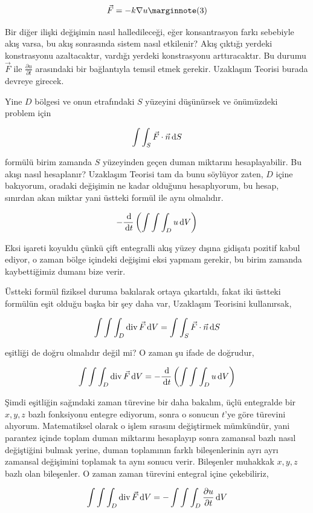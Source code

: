 \documentclass[12pt,fleqn]{article}\usepackage{../../common}
\begin{document}
$$
\vec{F} = -k \nabla u
\mlabel{3}
$$

Bir diğer ilişki değişimin nasıl halledileceği, eğer konsantrasyon farkı
sebebiyle akış varsa, bu akış sonrasında sistem nasıl etkilenir? Akış çıktığı
yerdeki konstrasyonu azaltacaktır, vardığı yerdeki konstrasyonu arttıracaktır.
Bu durumu $\vec{F}$ ile $\frac{\partial u}{\partial t}$ arasındaki bir
bağlantıyla temsil etmek gerekir. Uzaklaşım Teorisi burada devreye girecek.

Yine $D$ bölgesi ve onun etrafındaki $S$ yüzeyini düşünürsek ve önümüzdeki
problem için

$$
\int \int_S \vec{F} \cdot \vec{n} \,\mathrm{d} S
$$

formülü birim zamanda $S$ yüzeyinden geçen duman miktarını hesaplayabilir.  Bu
akışı nasıl hesaplanır? Uzaklaşım Teorisi tam da bunu söylüyor zaten, $D$ içine
bakıyorum, oradaki değişimin ne kadar olduğunu hesaplıyorum, bu hesap, sınırdan
akan miktar yani üstteki formül ile aynı olmalıdır.

$$
- \frac{\,\mathrm{d} }{\,\mathrm{d} t} \left(
\int \int \int_D u \,\mathrm{d} V
\right)
$$

Eksi işareti koyuldu çünkü çift entegralli akış yüzey dışına gidişatı pozitif
kabul ediyor, o zaman bölge içindeki değişimi eksi yapmam gerekir, bu birim
zamanda kaybettiğimiz dumanı bize verir.

Üstteki formül fiziksel duruma bakılarak ortaya çıkartıldı, fakat iki üstteki
formülün eşit olduğu başka bir şey daha var, Uzaklaşım Teorisini kullanırsak,

$$
\int \int \int_D \operatorname{div} \vec{F} \,\mathrm{d} V =
\int \int_S \vec{F} \cdot \vec{n} \,\mathrm{d} S
$$

eşitliği de doğru olmalıdır değil mi? O zaman şu ifade de doğrudur,

$$
\int \int \int_D \operatorname{div} \vec{F} \,\mathrm{d} V =
- \frac{\,\mathrm{d} }{\,\mathrm{d} t} \left( \int \int \int_D u \,\mathrm{d} V \right)
$$

Şimdi eşitliğin sağındaki zaman türevine bir daha bakalım, üçlü entegralde bir
$x,y,z$ bazlı fonksiyonu entegre ediyorum, sonra o sonucun $t$'ye göre türevini
alıyorum. Matematiksel olarak o işlem sırasını değiştirmek mümkündür, yani
parantez içinde toplam duman miktarını hesaplayıp sonra zamansal bazlı nasıl
değiştiğini bulmak yerine, duman toplamının farklı bileşenlerinin ayrı ayrı
zamansal değişimini toplamak ta aynı sonucu verir. Bileşenler muhakkak $x,y,z$
bazlı olan bileşenler. O zaman zaman türevini entegral içine çekebiliriz,

$$
\int \int \int_D \operatorname{div} \vec{F} \,\mathrm{d} V =
- \int \int \int_D \frac{\partial u}{\partial t} \,\mathrm{d} V 
$$
\end{document}
